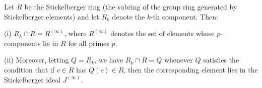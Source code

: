 Let $R$ be the Stickelberger ring (the subring of the group ring generated by Stickelberger elements) and let $R_k$ denote the $k$-th component. Then:

(i) $R_k \cap R = R^{(\infty)}$, where $R^{(\infty)}$ denotes the set of elements whose $p$-components lie in $R$ for all primes $p$.

(ii) Moreover, letting $Q = R_k$, we have $R_k \cap R = Q$ whenever $Q$ satisfies the condition that if $c \in R$ has $Q(c) \in R$, then the corresponding element lies in the Stickelberger ideal $J^{(\infty)}$.
